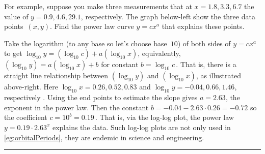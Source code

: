 \begin{table}
\begin{minipage}{\linewidth}
For example, suppose you make three measurements that at $x=1.8,3.3,6.7$ the value of $y=0.9,4.6,29.1$, respectively.  
The graph below-left show the three data points~$(x,y)$.  
Find the power law curve $y=cx^a$ that explains these points.
\begin{center} 
 \hfil
{} 
\end{center}
Take the logarithm (to any base so let's choose base~$10$) of both sides of $y=cx^a$ to get $\log_{10} y=(\log_{10} c)+a(\log_{10} x)$, equivalently, $(\log_{10} y)=a(\log_{10} x)+b$ for constant $b=\log_{10} c$\,.
That is, there is a straight line relationship between $(\log_{10} y)$ and $(\log_{10} x)$, as illustrated above-right.
Here $\log_{10}x=0.26,0.52,0.83$ and $\log_{10}y=-0.04,0.66,1.46$, respectively \twodp.
Using the end points to estimate the slope gives $a=2.63$, the exponent in the power law.
Then the constant $b=-0.04-2.63\cdot0.26=-0.72$ so the coefficient $c=10^b=0.19$\,.
That is, via the log-log plot, the power law $y=0.19\cdot 2.63^x$ explains the data.
Such log-log plots are not only used in \autoref{eg:orbitalPeriods}, they are endemic in science and engineering.
\end{minipage}
\hrule
\end{table}




